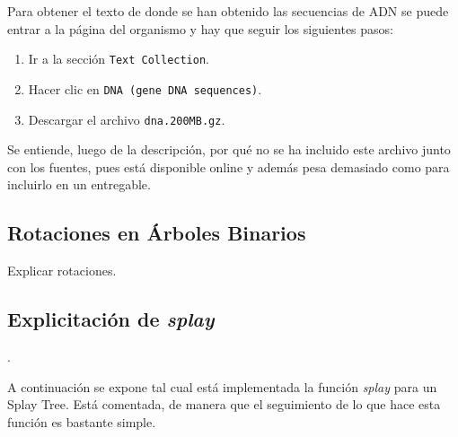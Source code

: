 \documentclass[12pt,letterpaper]{report}
\begin{document}
Para obtener el texto de donde se han obtenido las secuencias de ADN se puede entrar a la página del organismo y hay que seguir los siguientes pasos:
\begin{enumerate}
\item Ir a la sección \texttt{Text Collection}.
\item Hacer clic en \texttt{DNA (gene DNA sequences)}.
\item Descargar el archivo \texttt{dna.200MB.gz}.
\end{enumerate}

Se entiende, luego de la descripción, por qué no se ha incluido este archivo junto con los fuentes, pues está disponible online y además pesa demasiado como para incluirlo en un entregable.

\subsection{Rotaciones en Árboles Binarios}
\label{subsec:rotaciones}

Explicar rotaciones.

\subsection{Explicitación de \emph{splay}}.
\label{subsec:splay_anexos}

A continuación se expone tal cual está implementada la función \emph{splay} para un Splay Tree. Está comentada, de manera que el seguimiento de lo que hace esta función es bastante simple.\\
\end{document}
